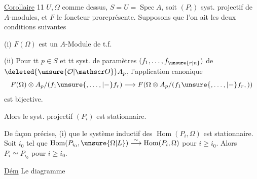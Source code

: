 
\uline{Corollaire} 11  $U,\Omega$ comme dessus,   $S=U=\operatorname{Spec}A$, soit $(P_i)$   syst. projectif de $A$-modules, et $F$ le foncteur  proreprésente. Supposons que l'on ait les deux conditions suivantes

(i) $F(\Omega)$ est un $A$-Module de t.f.

(ii) Pour tt $p\in S$ et tt syst. de paramètres $(f_1,\ldots,f_{\unsure{r|n}})$ de $\deleted{\unsure{\mathcal O|\mathscr O}}A_p$, l'application canonique
\[
 F(\Omega)\otimes A_p/(f_1\unsure{,\ldots,|-}f_r)
 \longrightarrow F(\Omega\otimes A_p/(f_1\unsure{,\ldots,|-}f_r,))
\]
est bijective.

Alors le syst. projectif $(P_i)$ est stationnaire.

De façon précise, (i)   que le système inductif des $\operatorname{Hom}(P_i,\Omega)$ est stationnaire. Soit  $i_0$ tel que $\operatorname{Hom}(P_{i_0},\unsure{\Omega|L})\overset{\sim}{\longrightarrow}\operatorname{Hom}(P_i,\Omega)$ pour $i\geq i_0$. Alors $P_i\simeq P_{i_0}$ pour $i\geq i_0$.

\uline{Dém} Le diagramme

